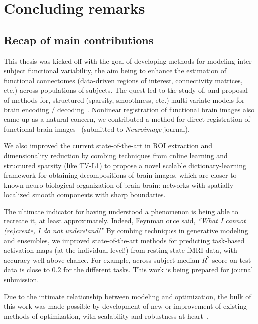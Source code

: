 \chapter{Concluding remarks}\label{chap:conclusion}

\minitoc

\section{Recap of main contributions}
This thesis was kicked-off with the goal of developing methods for modeling inter-subject
functional variability, the aim being to enhance the estimation of functional connectomes
(data-driven regions of interest, connectivity matrices, etc.)
across populations of subjects. The quest led to the study of, and proposal of methods for, structured (sparsity, smoothness, etc.) multi-variate models for brain encoding / decoding~\citep{dohmatob2015speeding,abrahamregion,eickenberg2015total,pelle2016multivariate}. Nonlinear registration of functional brain images also came up as a natural concern, we contributed a method for direct registration of functional brain images~\citep{dohmatob2016epi2epi} (submitted to \textit{Neuroimage} journal).

We also improved the current state-of-the-art in ROI extraction and dimensionality reduction by combing techniques from online learning and structured sparsity (like TV-L1) to propose a novel scalable dictionary-learning framework for obtaining decompositions of brain images, which are closer to known neuro-biological organization of brain brain: networks with spatially localized smooth components with sharp boundaries.

The ultimate indicator for having understood a phenomenon is being able to recreate it, at least approximately. Indeed, Feynman once said, \textit{``What I cannot (re)create, I do not understand!''} By combing techniques in generative modeling and ensembles, we improved state-of-the-art methods for predicting task-based activation maps (at the individual level!) from resting-state fMRI data, with accuracy well above chance. For example, across-subject median $R^2$ score on test data is close to $0.2$ for the different tasks. This work is being prepared for journal submission.

Due to the intimate relationship between modeling and optimization, the
bulk of this work was made possible by development of new or improvement of existing methods of
optimization, with scalability and robustness at heart~\citep{dohmatob2014benchmarking,dohmatob2015local,varoquaux2015faasta,dohmatob2015simple}.


